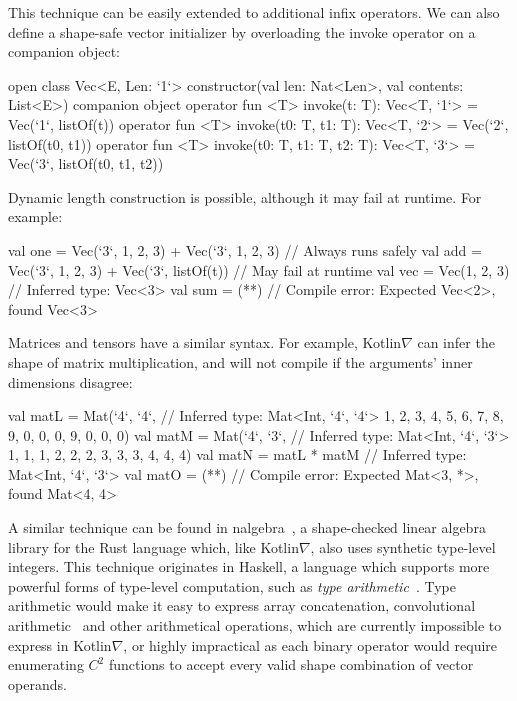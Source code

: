 \documentclass[12pt,initial,twoside,maitrise]{dms}
\makeatletter
\def\uwave{\bgroup \markoverwith{\lower3.5\p@\hbox{\sixly \textcolor{red}{\char58}}}\ULon}
\numberwithin{equation}{section}
\numberwithin{table}{chapter}
\numberwithin{figure}{chapter}
\makeatother
\begin{document}
%
This technique can be easily extended to additional infix operators. We can also define a shape-safe vector initializer by overloading the invoke operator on a companion object:
%
\begin{kotlinlisting}
open class Vec<E, Len: `1`> constructor(val len: Nat<Len>, val contents: List<E>) {
  companion object {
    operator fun <T> invoke(t: T): Vec<T, `1`> = Vec(`1`, listOf(t))
    operator fun <T> invoke(t0: T, t1: T): Vec<T, `2`> = Vec(`2`, listOf(t0, t1))
    operator fun <T> invoke(t0: T, t1: T, t2: T): Vec<T, `3`> = Vec(`3`, listOf(t0, t1, t2))
  }
}
\end{kotlinlisting}
%
Dynamic length construction is possible, although it may fail at runtime. For example:
%
\begin{kotlinlisting}
val one = Vec(`3`, 1, 2, 3) + Vec(`3`, 1, 2, 3)   // Always runs safely
val add = Vec(`3`, 1, 2, 3) + Vec(`3`, listOf(t)) // May fail at runtime
val vec = Vec(1, 2, 3) // Inferred type: Vec<3>
val sum = (*\uwave{Vec(`2`, 1, 2) + add}*) // Compile error: Expected Vec<2>, found Vec<3>
\end{kotlinlisting}
%
Matrices and tensors have a similar syntax. For example, Kotlin$\nabla$ can infer the shape of matrix multiplication, and will not compile if the arguments' inner dimensions disagree:
%
\begin{kotlinlisting}
val matL = Mat(`4`, `4`, // Inferred type: Mat<Int, `4`, `4`>
               1, 2, 3, 4,
               5, 6, 7, 8,
               9, 0, 0, 0,
               9, 0, 0, 0)
val matM = Mat(`4`, `3`, // Inferred type: Mat<Int, `4`, `3`>
               1, 1, 1,
               2, 2, 2,
               3, 3, 3,
               4, 4, 4)
val matN = matL * matM // Inferred type: Mat<Int, `4`, `3`>
val matO = (*\uwave{matM *\ matM}*) // Compile error: Expected Mat<3, *>, found Mat<4, 4>
\end{kotlinlisting}
%
A similar technique can be found in nalgebra~\citep{crozet2019nalgebra}, a shape-checked linear algebra library for the Rust language which, like Kotlin$\nabla$, also uses synthetic type-level integers. This technique originates in Haskell, a language which supports more powerful forms of type-level computation, such as \textit{type arithmetic}~\citep{kiselyov2005number}. Type arithmetic would make it easy to express array concatenation, convolutional arithmetic~\citep{dumoulin2016guide} and other arithmetical operations, which are currently impossible to express in Kotlin$\nabla$, or highly impractical as each binary operator would require enumerating $C^2$ functions to accept every valid shape combination of vector operands.
\end{document}
